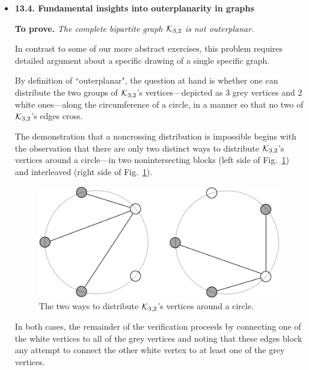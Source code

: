 \begin{itemize}
\medskip\item 
{\bf 13.4. Fundamental insights into outerplanarity in graphs}

\smallskip

{\bf To prove.} {\em The complete bipartite graph $\mbox{$\cal K$}_{3,2}$ is not outerplanar.}

\medskip

In contrast to some of our more abstract exercises, this problem requires detailed argument about a specific drawing of a single specific graph.

\smallskip

By definition of ``outerplanar", the question at hand is whether one can distribute the two groups of $\mbox{$\cal K$}_{3,2}$'s vertices---depicted as $3$ grey vertices and $2$ white ones---along the circumference of a circle, in a manner so that no two of $\mbox{$\cal K$}_{3,2}$'s edges cross.

\smallskip

The demonstration that a noncrossing distribution is impossible begins with the observation that there are only two distinct ways to distribute $\mbox{$\cal K$}_{3,2}$'s vertices around a circle---in two nonintersecting blocks (left side of Fig.~\ref{fig:outerplanarK32}) and interleaved (right side of Fig.~\ref{fig:outerplanarK32}).
\begin{figure}[h]
\begin{center}
        \includegraphics[scale=0.3]{FiguresGraph/outerplanarK3,2}
        \caption{The two ways to distribute $\mbox{$\cal K$}_{3,2}$'s vertices around a circle.}
        \label{fig:outerplanarK32}
\end{center}
\end{figure}
In both cases, the remainder of the verification proceeds by connecting one of the white vertices to all of the grey vertices and noting that these edges block any attempt to connect the other white vertex to at least one of the grey vertices.
\end{itemize}

